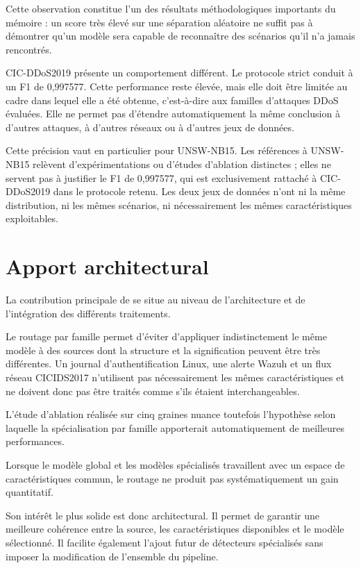 Cette observation constitue l'un des résultats méthodologiques importants du mémoire : un score très élevé sur une séparation aléatoire ne suffit pas à démontrer qu'un modèle sera capable de reconnaître des scénarios qu'il n'a jamais rencontrés.

CIC-DDoS2019 présente un comportement différent. Le protocole strict conduit à un F1 de 0,997577. Cette performance reste élevée, mais elle doit être limitée au cadre dans lequel elle a été obtenue, c'est-à-dire aux familles d'attaques DDoS évaluées. Elle ne permet pas d'étendre automatiquement la même conclusion à d'autres attaques, à d'autres réseaux ou à d'autres jeux de données.

Cette précision vaut en particulier pour UNSW-NB15. Les références à UNSW-NB15 relèvent d'expérimentations ou d'études d'ablation distinctes ; elles ne servent pas à justifier le F1 de 0,997577, qui est exclusivement rattaché à CIC-DDoS2019 dans le protocole retenu. Les deux jeux de données n'ont ni la même distribution, ni les mêmes scénarios, ni nécessairement les mêmes caractéristiques exploitables.

\section{Apport architectural}

La contribution principale de \logminer{} se situe au niveau de l'architecture et de l'intégration des différents traitements.

Le routage par famille permet d'éviter d'appliquer indistinctement le même modèle à des sources dont la structure et la signification peuvent être très différentes. Un journal d'authentification Linux, une alerte Wazuh et un flux réseau CICIDS2017 n'utilisent pas nécessairement les mêmes caractéristiques et ne doivent donc pas être traités comme s'ils étaient interchangeables.

L'étude d'ablation réalisée sur cinq graines nuance toutefois l'hypothèse selon laquelle la spécialisation par famille apporterait automatiquement de meilleures performances.

Lorsque le modèle global et les modèles spécialisés travaillent avec un espace de caractéristiques commun, le routage ne produit pas systématiquement un gain quantitatif.

Son intérêt le plus solide est donc architectural. Il permet de garantir une meilleure cohérence entre la source, les caractéristiques disponibles et le modèle sélectionné. Il facilite également l'ajout futur de détecteurs spécialisés sans imposer la modification de l'ensemble du pipeline.

